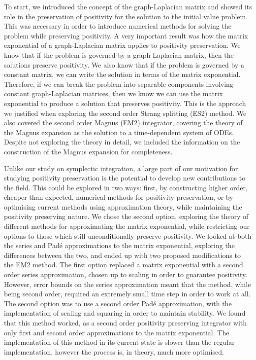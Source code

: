 To start, we introduced the concept of the graph-Laplacian matrix and showed its role in the preservation of positivity for the solution to the initial value problem.
This was necessary in order to introduce numerical methods for solving the problem while preserving positivity.
A very important result was how the matrix exponential of a graph-Laplacian matrix applies to positivity preservation.
We know that if the problem is governed by a graph-Laplacian matrix, then the solutions preserve positivity.
We also know that if the problem is governed by a constant matrix, we can write the solution in terms of the matrix exponential.
Therefore, if we can break the problem into separable components involving constant graph-Laplacian matrices, then we know we can use the matrix exponential to produce a solution that preserves positivity.
This is the approach we justified when exploring the second order Strang splitting (ES2) method.
We also covered the second order Magnus (EM2) integrator, covering the theory of the Magnus expansion as the solution to a time-dependent system of ODEs.
Despite not exploring the theory in detail, we included the information on the construction of the Magnus expansion for completeness.

Unlike our study on symplectic integration, a large part of our motivation for studying positivity preservation is the potential to develop new contributions to the field.
This could be explored in two ways: first, by constructing higher order, cheaper-than-expected, numerical methods for positivity preservation,
or by optimising current methods using approximation theory, while maintaining the positivity preserving nature.
We chose the second option, exploring the theory of different methods for approximating the matrix exponential, while restricting our options to those which still unconditionally preserve positivity.
We looked at both the series and Pad\'e approximations to the matrix exponential, exploring the differences between the two, and ended up with two proposed modifications to the EM2 method.
The first option replaced a matrix exponential with a second order series approximation, chosen up to scaling in order to guarantee positivity.
However, error bounds on the series approximation meant that the method, while being second order, required an extremely small time step in order to work at all.
The second option was to use a second order Pad\'e approximation, with the implementation of scaling and squaring in order to maintain stability.
We found that this method worked, as a second order positivity preserving integrator with only first and second order approximations to the matrix exponential.
The implementation of this method in its current state is slower than the regular implementation,
however the process is, in theory, much more optimised.

